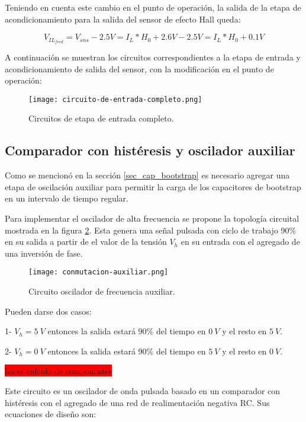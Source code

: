 Teniendo en cuenta este cambio en el punto de operación, la salida de la etapa de acondicionamiento para la salida del sensor de efecto Hall queda:

\begin{equation} \label{eq_salida_restador_hall_2}
	V_{IL_{feed}}=V_{sns}-2.5V =I_L*H_0 + 2.6V - 2.5V =I_L*H_0+0.1V
\end{equation}

A continuación se muestran los circuitos correspondientes a la etapa de entrada y acondicionamiento de salida del sensor, con la modificación en el punto de operación:

\begin{figure}[H]
	\centering
	\texttt{[image: circuito-de-entrada-completo.png]}
	\caption{Circuitos de etapa de entrada completo.}
	\label{fig:img_circuito-de-entrada-completo.png}
\end{figure}

\subsection{Comparador con histéresis y oscilador auxiliar}

Como se mencionó en la sección \ref{sec_cap_bootstrap} es necesario agregar una etapa de oscilación auxiliar para permitir la carga de los capacitores de bootstrap en un intervalo de tiempo regular.

Para implementar el oscilador de alta frecuencia se propone la topología circuital mostrada en la figura \ref{fig:img_frecuencia-auxiliar}. Esta genera una señal pulsada con ciclo de trabajo 90\% en su salida a partir de el valor de la tensión $V_h$ en su entrada con el agregado de una inversión de fase. 

\begin{figure}[H]
	\centering
	\texttt{[image: conmutacion-auxiliar.png]}
	\caption{Circuito oscilador de frecuencia auxiliar.}
	\label{fig:img_frecuencia-auxiliar}
\end{figure}

Pueden darse dos casos:

1- $V_h=5\:V$ entonces la salida estará 90\% del tiempo en $0\:V$ y  el resto en $5\:V$. 

2- $V_h=0\:V$ entonces la salida estará 90\% del tiempo en $5\:V$ y el resto en $0\:V$.

\colorbox{red}{hacer calculo de componentes}

Este circuito es un oscilador de onda pulsada basado en un comparador con histéresis con el agregado de una red de realimentación negativa RC. Sus ecuaciones de diseño son:

